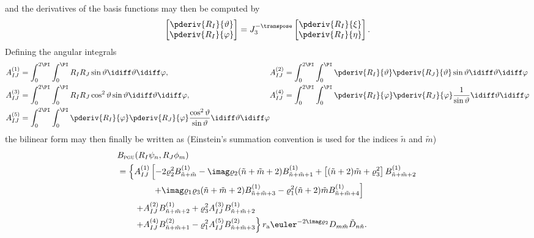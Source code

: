 and the derivatives of the basis functions may then be computed by
\begin{equation}
	\begin{bmatrix}
		\pderiv{R_I}{\vartheta}\\
		\pderiv{R_I}{\varphi}
	\end{bmatrix} = J_3^{-\transpose}\begin{bmatrix}
		\pderiv{R_I}{\xi}\\
		\pderiv{R_I}{\eta}	
	\end{bmatrix}.
\end{equation}
Defining the angular integrals
\begin{equation}\label{Eq2:infiniteElementsSurfaceIntegrals}
\begin{alignedat}{2}
	& A_{IJ}^{(1)} = \int_0^{2\PI}\int_0^\PI R_I R_J\sin\vartheta\idiff\vartheta\idiff\varphi,\qquad\qquad && A_{IJ}^{(2)} = \int_0^{2\PI}\int_0^\PI \pderiv{R_I}{\vartheta} \pderiv{R_J}{\vartheta}\sin\vartheta\idiff\vartheta\idiff\varphi\\
	& A_{IJ}^{(3)} = \int_0^{2\PI}\int_0^\PI R_I R_J\cos^2\vartheta\sin\vartheta\idiff\vartheta\idiff\varphi, \quad && A_{IJ}^{(4)} = \int_0^{2\PI}\int_0^\PI \pderiv{R_I}{\varphi} \pderiv{R_J}{\varphi}\frac{1}{\sin\vartheta}\idiff\vartheta\idiff\varphi\\
	& A_{IJ}^{(5)} = \int_0^{2\PI}\int_0^\PI \pderiv{R_I}{\varphi} \pderiv{R_J}{\varphi}\frac{\cos^2\vartheta}{\sin\vartheta}\idiff\vartheta\idiff\varphi
\end{alignedat}	
\end{equation}
the bilinear form may then finally be written as (Einstein's summation convention is used for the indices $\tilde{n}$ and $\tilde{m}$)
\begin{align}\label{Eq2:finalBilinearFormB_uc_a}
\begin{split}
	&B_{\textsc{pgu}}(R_I\psi_n,R_J\phi_m) \\
	 &= \left\{A_{IJ}^{(1)}\left[-2\varrho_2^2 B_{\tilde{n}+\tilde{m}}^{(1)} - \imag\varrho_2(\tilde{n}+\tilde{m}+2)B_{\tilde{n}+\tilde{m}+1}^{(1)} + \left[(\tilde{n}+2)\tilde{m}+\varrho_3^2\right]B_{\tilde{n}+\tilde{m}+2}^{(1)}\right. \right. \\
	  &{\hskip4em\relax}\left. \left. + \imag\varrho_1\varrho_3(\tilde{n}+\tilde{m}+2)B_{\tilde{n}+\tilde{m}+3}^{(1)} - \varrho_1^2(\tilde{n}+2)\tilde{m}B_{\tilde{n}+\tilde{m}+4}^{(1)}\right] \right. \\
	 &{\hskip2em\relax}\left. +A_{IJ}^{(2)}B_{\tilde{n}+\tilde{m}+2}^{(1)} + \varrho_3^2A_{IJ}^{(3)} B_{\tilde{n}+\tilde{m}+2}^{(1)}\right.\\
	 &{\hskip2em\relax}\left. +A_{IJ}^{(4)}B_{\tilde{n}+\tilde{m}+1}^{(2)} -\varrho_1^2A_{IJ}^{(5)} B_{\tilde{n}+\tilde{m}+3}^{(2)}
	 \right\}r_{\mathrm{a}}\euler^{-2\imag \varrho_2}D_{m\tilde{m}}\tilde{D}_{n\tilde{n}}.
\end{split}
\end{align}
